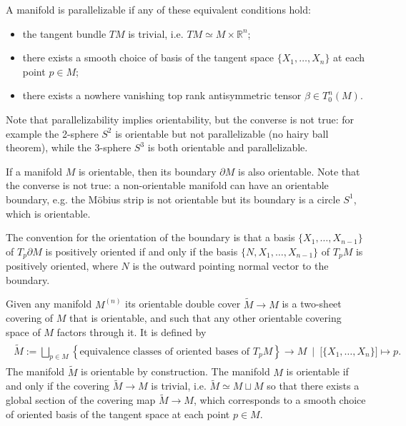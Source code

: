 \documentclass[../geometry_main.tex]{subfiles}
\begin{document}
\begin{mytheorem}
%
A manifold is parallelizable if any of these equivalent conditions hold:
\begin{itemize}
    \item the tangent bundle $TM$ is trivial, i.e. $TM \simeq M \times \mathbb{R}^n$;
    \item there exists a smooth choice of basis of the tangent space $\{X_1, \dots, X_n\}$ at each point $p\in M$;
    \item there exists a nowhere vanishing top rank antisymmetric tensor $\beta \in T^n_0(M)$.
\end{itemize}
Note that parallelizability implies orientability, but the converse is not true: for example the 2-sphere $S^2$ is orientable but not parallelizable (no hairy ball theorem), while the 3-sphere $S^3$ is both orientable and parallelizable. 
\end{mytheorem}


\begin{mytheorem}
If a manifold $M$ is orientable, then its boundary $\partial M$ is also orientable.
Note that the converse is not true: a non-orientable manifold can have an orientable boundary, e.g. the Möbius strip is not orientable but its boundary is a circle $S^1$, which is orientable.

The convention for the orientation of the boundary is that a basis $\{X_1, \dots, X_{n-1}\}$ of $T_p \partial M$ is positively oriented if and only if the basis $\{N, X_1, \dots, X_{n-1}\}$ of $T_p M$ is positively oriented, where $N$ is the outward pointing normal vector to the boundary.
\end{mytheorem}


\begin{mytheorem}
Given any manifold $M^{(n)}$ its orientable double cover $\tilde{M}\to M$ is a two-sheet covering of $M$ that is orientable, and such that any other orientable covering space of $M$ factors through it.
It is defined by
\begin{align}
\begin{aligned}
    \tilde{M} := \bigsqcup_{p\in M} \left\{ \text{equivalence classes of oriented bases of } T_p M \right\} \to M \,\,\, \Big|\,\,\,\big[\{X_1, \dots, X_n\}\big]\mapsto p.
\end{aligned}
\end{align}
%
The manifold $\tilde{M}$ is orientable by construction.
The manifold $M$ is orientable if and only if the covering $\tilde{M}\to M$ is trivial, i.e. $\tilde{M} \simeq M \sqcup M$ so that there exists a global section of the covering map $\tilde{M}\to M$, which corresponds to a smooth choice of oriented basis of the tangent space at each point $p\in M$.
\end{mytheorem}
\end{document}

